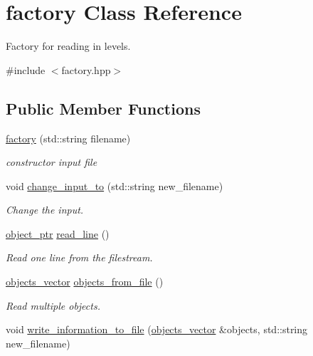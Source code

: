 \hypertarget{classfactory}{}\section{factory Class Reference}
\label{classfactory}


Factory for reading in levels.  




{\ttfamily \#include $<$factory.\+hpp$>$}

\subsection*{Public Member Functions}
\begin{DoxyCompactItemize}
\item 
\hyperlink{classfactory_af422815046ef8b9e95a4d8cb747fc43f}{factory} (std\+::string filename)
\begin{DoxyCompactList}\small\item\em constructor input file \end{DoxyCompactList}\item 
void \hyperlink{classfactory_a9e164a8fbb65188de99c39d55d7cc384}{change\+\_\+input\+\_\+to} (std\+::string new\+\_\+filename)
\begin{DoxyCompactList}\small\item\em Change the input. \end{DoxyCompactList}\item 
\hyperlink{drawable_8hpp_aab5add95f06d2ba25dbfed8eb07274fa}{object\+\_\+ptr} \hyperlink{classfactory_a82385866bc910c1b3a3e82d56487dd24}{read\+\_\+line} ()
\begin{DoxyCompactList}\small\item\em Read one line from the filestream. \end{DoxyCompactList}\item 
\hyperlink{drawable_8hpp_a6c0fdb1dfd0c34dbbdbb5dcd3c608b07}{objects\+\_\+vector} \hyperlink{classfactory_afb2fad4ac9b0f39b1bfc3f3fc8d218b6}{objects\+\_\+from\+\_\+file} ()
\begin{DoxyCompactList}\small\item\em Read multiple objects. \end{DoxyCompactList}\item 
void \hyperlink{classfactory_af17f2a44d75cf8ccf712384341c2fcde}{write\+\_\+information\+\_\+to\+\_\+file} (\hyperlink{drawable_8hpp_a6c0fdb1dfd0c34dbbdbb5dcd3c608b07}{objects\+\_\+vector} \&objects, std\+::string new\+\_\+filename)

\end{DoxyCompactItemize}
